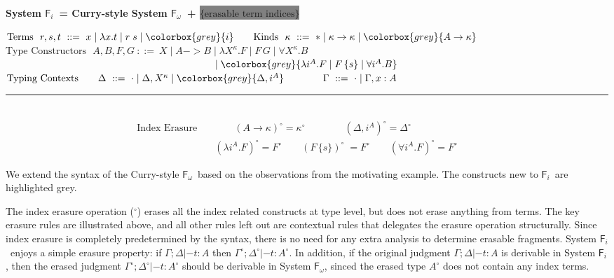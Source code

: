 \documentclass{article}
\newcommand{\Fi}{\ensuremath{\mathsf{F}_i}}
\newcommand{\Fw}{\ensuremath{\mathsf{F}_\omega}}
\newcommand{\newFi}[1]{\colorbox{grey}{\ensuremath{#1}}}
\begin{document}
\begin{center}
\textbf{
 System \Fi ~= Curry-style System \Fw\ + \newFi{\text{\{erasable term indices\}}}}
 \vspace*{-7pt}
\end{center}
\begin{framed}\vspace{-6pt}\noindent
$
\text{Terms}~~ r,s,t ~ ::= ~ x \mid \lambda x.t \mid r\;s \mid \newFi{i}
\qquad
\text{Kinds}~~ \kappa ~ ::= ~ *
                                \mid \kappa -> \kappa
                                \mid \newFi{A -> \kappa}$ \vspace*{2pt} \\
$
\text{Type Constructors}~~~
        A,B,F,G               ~ ::= ~ X
                                \mid A -> B
                                \mid \lambda X^\kappa.F
                                \mid F\,G
                                \mid \forall X^\kappa . B$\\
$~\qquad\qquad\qquad\qquad\qquad\qquad\qquad\qquad\qquad\qquad\quad
\mid \newFi{\lambda i^A.F
                                \mid F\,\{s\}
                                \mid \forall i^A . B}$ \\
$\text{Typing Contexts}
\qquad \Delta                ~ ::= ~ \cdot
                                \mid \Delta, X^\kappa
                                \mid \newFi{\Delta, i^A}
\qquad\qquad \Gamma                ~ ::= ~ \cdot
                                \mid \Gamma, x : A 
$\vspace*{3pt}
\hrule ~ \\ \vspace*{-20pt}
\begin{align*}
 \!\!\!\!\!\!\!\!\text{Index Erasure}\quad
& \qquad (A\to\kappa)^{\circ}=\kappa^{\circ} \qquad \qquad
(\Delta,i^A)^\circ = \Delta^\circ
\\
& (\lambda i^{A}.F)^{\circ}=F^{\circ} \qquad
(F\,\{s\})^{\circ}\;=F^{\circ} \qquad
(\forall i^{A}.F)^{\circ}=F^{\circ} \qquad
\end{align*}\vspace*{-25pt}
\end{framed}\vspace*{-5pt}
We extend the syntax of the Curry-style \Fw\ based on the observations from
the motivating example. The constructs new to \Fi\ are highlighted grey.

The index erasure operation ($^\circ$) erases all the index related constructs
at type level, but does not erase anything from terms. The key erasure rules are
illustrated above, and all other rules left out are contextual rules that
delegates the erasure operation structurally. Since index erasure is completely
predetermined by the syntax, there is no need for any extra analysis
to determine erasable fragments. System \Fi\ enjoys a simple erasure property:
if $\Gamma;\Delta|- t:A$ then $\Gamma^\circ;\Delta^\circ|- t:A^\circ$.
In addition, if the original judgment $\Gamma;\Delta|- t:A$ is derivable in
System \Fi, then the erased judgment $\Gamma^\circ;\Delta^\circ|- t:A^\circ$
should be derivable in System \Fw, sinced the erased type $A^\circ$ does not
contain any index terms.
\end{document}
